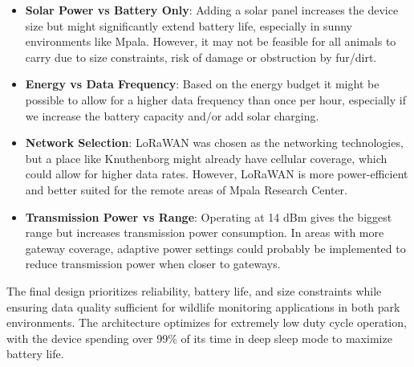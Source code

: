 \begin{itemize}
  \item \textbf{Solar Power vs Battery Only}: Adding a solar panel increases the device size but might significantly extend battery life, especially in sunny environments like Mpala. However, it may not be feasible for all animals to carry due to size constraints, risk of damage or obstruction by fur/dirt.

  \item \textbf{Energy vs Data Frequency}: Based on the energy budget it might be possible to allow for a higher data frequency than once per hour, especially if we increase the battery capacity and/or add solar charging.
  
  \item \textbf{Network Selection}: LoRaWAN was chosen as the networking technologies, but a place like Knuthenborg might already have cellular coverage, which could allow for higher data rates. However, LoRaWAN is more power-efficient and better suited for the remote areas of Mpala Research Center.
  
  \item \textbf{Transmission Power vs Range}: Operating at 14 dBm gives the biggest range but increases transmission power consumption. In areas with more gateway coverage, adaptive power settings could probably be implemented to reduce transmission power when closer to gateways.
\end{itemize}

The final design prioritizes reliability, battery life, and size constraints while ensuring data quality sufficient for wildlife monitoring applications in both park environments. The architecture optimizes for extremely low duty cycle operation, with the device spending over 99\% of its time in deep sleep mode to maximize battery life.